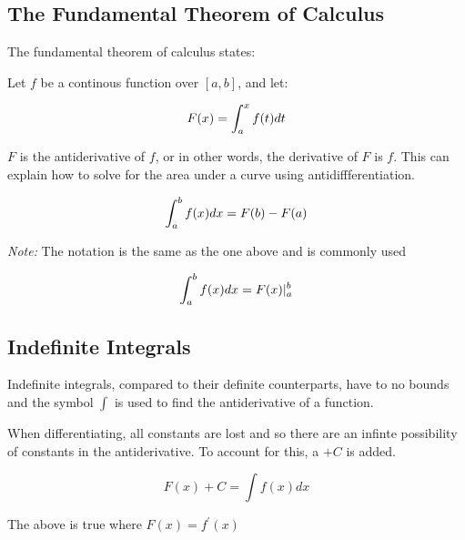 \documentclass[12pt]{article}
\begin{document}
        \subsection{The Fundamental Theorem of Calculus}

        The fundamental theorem of calculus states:

        Let $f$ be a continous function over $[a, b]$, and let:

        \[
            F(x) = \int_a^x f(t) \space dt    
        \]

        $F$ is the antiderivative of $f$, or in other words, the derivative of $F$ is $f$. This can 
        explain how to solve for the area under a curve using antidiffferentiation.

        \[
            \int_a^b f(x) \space dx = F(b) - F(a)    
        \]

        \noindent \textit{Note:} The notation is the same as the one above and is commonly used

        \[
            \int_a^b f(x) \space dx = F(x) {|}_a^b   
        \]

        \subsection{Indefinite Integrals}

        Indefinite integrals, compared to their definite counterparts, have to no bounds
        and the symbol $\int$ is used to find the antiderivative of a function. 

        When differentiating, all constants are lost and so there are an infinte possibility
        of constants in the antiderivative. To account for this, a $+C$ is added.

        \[
            F(x) + C = \int f(x)dx    
        \]

        The above is true where $F(x) = f^{\prime}(x)$
\end{document}
